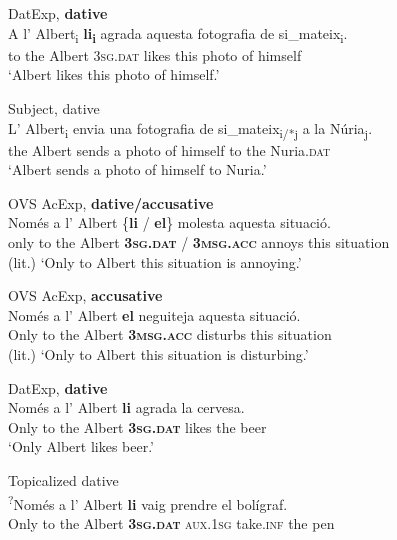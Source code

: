 \documentclass[output=paper,colorlinks,citecolor=brown,modfonts,nonflat]{langsci/langscibook}
\begin{document}
 \ex DatExp, \textbf{dative}\label{ex:royo:8b}\\
 \gll A l’ Albert\textsubscript{i} \textbf{li\textsubscript{i}} agrada aquesta fotografia de si\_mateix\textsubscript{i}.\\
 to the Albert {\textsc{3sg.dat}} likes this photo of himself\\
\glt ‘Albert likes this photo of himself.’


  \ex Subject, dative\label{ex:royo:8d}\\
 \gll L’ Albert\textsubscript{i} envia una fotografia de si\_mateix\textsubscript{i/*j} a la Núria\textsubscript{j}.\\
 the Albert sends a photo of himself to the Nuria.\textsc{dat}\\
\glt ‘Albert sends a photo of himself to Nuria.’

 \z
 \z

\ea%
 \label{ex:royo:9}
 \ea OVS AcExp, \textbf{dative/accusative} \label{ex:royo:9a}\\
 \gll Només a l’ Albert \{\textbf{li} / \textbf{el}\} molesta aquesta situació. \\
 only to the Albert \textbf{\textsc{3sg.dat}} / \textbf{\textsc{3msg.acc}} annoys this situation \\
\glt (lit.) ‘Only to Albert this situation is annoying.’

 \ex OVS AcExp, \textbf{accusative} \label{ex:royo:9b}\\
 \gll Només a l’ Albert \textbf{el} neguiteja aquesta situació.\\
 Only to the Albert \textbf{\textsc{3msg.acc}} disturbs this situation\\
 \glt (lit.) ‘Only to Albert this situation is disturbing.’

  \ex DatExp, \textbf{dative} \label{ex:royo:9c}\\
 \gll   Només a l’ Albert \textbf{li} agrada la cervesa. \\
 Only to the Albert \textbf{\textsc{3sg.dat}} likes the beer\\
\glt ‘Only Albert likes beer.’

 \ex Topicalized dative \label{ex:royo:9d}\\
\gll \textsuperscript{?}Només a l’ Albert \textbf{li} vaig prendre el bolígraf.\footnotemark{}\\
 Only to the Albert \textbf{\textsc{3sg.dat}} \textsc{aux.1sg} take.\textsc{inf} the pen\\
\glt
 \z
 \z
\end{document}
